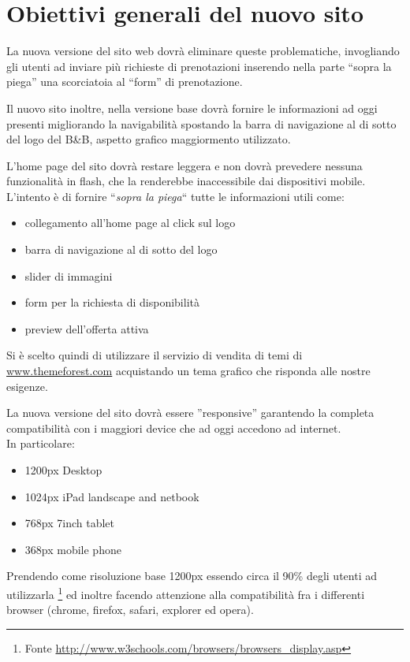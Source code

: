 \documentclass[a4paper,12pt,hidelinks]{report}
\begin{document}
\section{Obiettivi generali del nuovo sito}
  La nuova versione del sito web dovrà eliminare queste problematiche, invogliando gli utenti ad inviare più richieste di prenotazioni
  inserendo nella parte ``sopra la piega'' una scorciatoia al ``form'' di prenotazione.
  \par Il nuovo sito inoltre, nella versione base dovrà fornire le informazioni ad oggi presenti migliorando la navigabilità spostando la barra di navigazione 
  al di sotto del logo del B\&B, aspetto grafico maggiormento utilizzato.
  \par L'home page del sito dovrà restare leggera e non dovrà prevedere nessuna funzionalità in flash, che la renderebbe inaccessibile dai dispositivi mobile.
  L'intento è di fornire ``\textit{sopra la piega}`` tutte le informazioni utili come:
  \begin{itemize}
    \item collegamento all'home page al click sul logo
    \item barra di navigazione al di sotto del logo
    \item slider di immagini
    \item form per la richiesta di disponibilità
    \item preview dell'offerta attiva
  \end{itemize}
  \par Si è scelto quindi di utilizzare il servizio di vendita di temi di \url{www.themeforest.com} acquistando un tema grafico che risponda alle nostre esigenze.
  \par La nuova versione del sito dovrà essere ''responsive'' garantendo la completa compatibilità con i maggiori device che ad oggi accedono ad internet.
  \\In particolare:
  \begin{itemize}
    \item 1200px Desktop
    \item 1024px iPad landscape and netbook
    \item 768px 7inch tablet
    \item 368px mobile phone
  \end{itemize}
  Prendendo come risoluzione base 1200px essendo circa il 90\% degli utenti ad utilizzarla \footnote{Fonte \url{http://www.w3schools.com/browsers/browsers_display.asp}}
  ed inoltre facendo attenzione alla compatibilità fra i differenti browser (chrome, firefox, safari, explorer ed opera).
\end{document}
